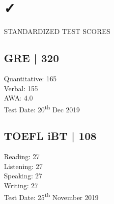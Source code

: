 \documentclass{my_cv}
\begin{document}
\section{\faCheck}{STANDARDIZED TEST SCORES}
    \begin{minipage}[t]{.5\textwidth}
        \subsection{GRE | 320}
            Quantitative: 165 \\
            Verbal: 155 \\
            AWA: 4.0 \\
            Test Date: 20\textsuperscript{th} Dec 2019
    \end{minipage}
    \hfill
    \begin{minipage}[t]{.45\textwidth}
        \subsection{TOEFL iBT | 108}
            Reading: 27 \\
            Listening: 27 \\
            Speaking: 27 \\
            Writing: 27 \\
            Test Date: 25\textsuperscript{th} November 2019 \\
    \end{minipage}

\end{document}
